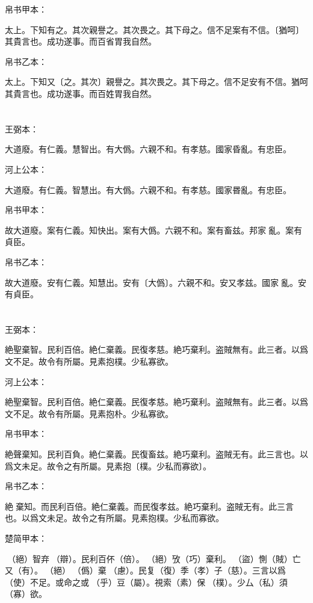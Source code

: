 \documentclass[a5paper]{ctexbook}
\begin{document}
    帛书甲本：

    太上。下知有之。其次親譽之。其次畏之。其下母之。信不足案有不信。〔猶呵〕其貴言也。成功遂事。而百省胃我自然。

    帛书乙本：

    太上。下知又〔之。其次〕親譽之。其次畏之。其下母之。信不足安有不信。猶呵其貴言也。成功遂事。而百姓胃我自然。

    \chapter{}
    王弼本：

    大道廢。有仁義。慧智出。有大僞。六親不和。有孝慈。國家昏亂。有忠臣。

    河上公本：

    大道廢。有仁義。智慧出。有大僞。六親不和。有孝慈。國家昬亂。有忠臣。

    帛书甲本：

    故大道廢。案有仁義。知快出。案有大僞。六親不和。案有畜兹。邦家𨴽亂。案有貞臣。

    帛书乙本：

    故大道廢。安有仁義。知慧出。安有〔大僞〕。六親不和。安又孝兹。國家𨴽亂。安有貞臣。

    \chapter{}
    王弼本：

    絶聖棄智。民利百倍。絶仁棄義。民復孝慈。絶巧棄利。盗賊無有。此三者。以爲文不足。故令有所屬。見素抱樸。少私寡欲。

    河上公本：

    絶聖棄智。民利百倍。絶仁棄義。民復孝慈。絶巧棄利。盗賊無有。此三者。以爲文不足。故令有所屬。見素抱朴。少私寡欲。

    帛书甲本：

    絶聲棄知。民利百負。絶仁棄義。民復畜兹。絶巧棄利。盗賊无有。此三言也。以爲文未足。故令之有所屬。見素抱〔樸。少私而寡欲〕。

    帛书乙本：

    絶𦔻棄知。而民利百倍。絶仁棄義。而民復孝兹。絶巧棄利。盗賊无有。此三言也。以爲文未足。故令之有所屬。見素抱樸。少私而寡欲。

    楚简甲本：

    󶴌（絕）智弃󶴉（辯）。民利百伓（倍）。󶴌（絕）攷（巧）棄利。󶴊（盜）惻（賊）亡又（有）。󶴌（絕）𢠿（僞）棄󶴍（慮）。民复（復）季（孝）子（慈）。三言以爲󶴎（使）不足。或命之或󶴋（乎）豆（屬）。視索（素）保󶴏（樸）。少厶（私）須（寡）欲。
\end{document}
